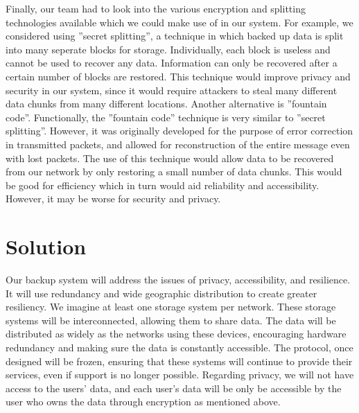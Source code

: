 Finally, our team had to look into the various encryption and splitting technologies available which we could make use of in our system.  For example, we considered using ''secret splitting'', a technique in which backed up data is split into many seperate blocks for storage.  Individually, each block is useless and cannot be used to recover any data.  Information can only be recovered after a certain number of blocks are restored.  This technique would improve privacy and security in our system, since it would require attackers to steal many different data chunks from many different locations.  Another alternative is ''fountain code''.  Functionally, the ''fountain code'' technique is very similar to ''secret splitting''.  However, it was originally developed for the purpose of error correction in transmitted packets, and allowed for reconstruction of the entire message even with lost packets.  The use of this technique would allow data to be recovered from our network by only restoring a small number of data chunks.  This would be good for efficiency which in turn would aid reliability and accessibility.  However, it may be worse for security and privacy.


\section{Solution}

Our backup system will address the issues of privacy, accessibility, and resilience. It will use redundancy and wide geographic distribution to create greater resiliency. We imagine at least one storage system per network. These storage systems will be interconnected, allowing them to share data. The data will be distributed as widely as the networks using these devices, encouraging hardware redundancy and making sure the data is constantly accessible. The protocol, once designed will be frozen, ensuring that these systems will continue to provide their services, even if support is no longer possible. Regarding privacy, we will not have access to the users' data, and each user's data will be only be accessible by the user who owns the data through encryption as mentioned above.